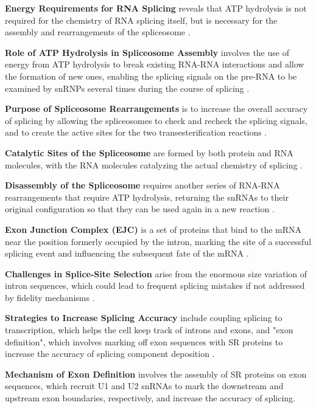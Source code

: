 \textbf{Energy Requirements for RNA Splicing} reveals that ATP hydrolysis is not required for the chemistry of RNA splicing itself, but is necessary for the assembly and rearrangements of the spliceosome \cite*{L1-Chapter6}.

\textbf{Role of ATP Hydrolysis in Spliceosome Assembly} involves the use of energy from ATP hydrolysis to break existing RNA-RNA interactions and allow the formation of new ones, enabling the splicing signals on the pre-RNA to be examined by snRNPs several times during the course of splicing \cite*{L1-Chapter6}.

\textbf{Purpose of Spliceosome Rearrangements} is to increase the overall accuracy of splicing by allowing the spliceosomes to check and recheck the splicing signals, and to create the active sites for the two transesterification reactions \cite*{L1-Chapter6}.

\textbf{Catalytic Sites of the Spliceosome} are formed by both protein and RNA molecules, with the RNA molecules catalyzing the actual chemistry of splicing \cite*{L1-Chapter6}.

\textbf{Disassembly of the Spliceosome} requires another series of RNA-RNA rearrangements that require ATP hydrolysis, returning the snRNAs to their original configuration so that they can be used again in a new reaction \cite*{L1-Chapter6}.

\textbf{Exon Junction Complex (EJC)} is a set of proteins that bind to the mRNA near the position formerly occupied by the intron, marking the site of a successful splicing event and influencing the subsequent fate of the mRNA \cite*{L1-Chapter6}.

\textbf{Challenges in Splice-Site Selection} arise from the enormous size variation of intron sequences, which could lead to frequent splicing mistakes if not addressed by fidelity mechanisms \cite*{L1-Chapter6}.

\textbf{Strategies to Increase Splicing Accuracy} include coupling splicing to transcription, which helps the cell keep track of introns and exons, and "exon definition", which involves marking off exon sequences with SR proteins to increase the accuracy of splicing component deposition \cite*{L1-Chapter6}.

\textbf{Mechanism of Exon Definition} involves the assembly of SR proteins on exon sequences, which recruit U1 and U2 snRNAs to mark the downstream and upstream exon boundaries, respectively, and increase the accuracy of splicing.


